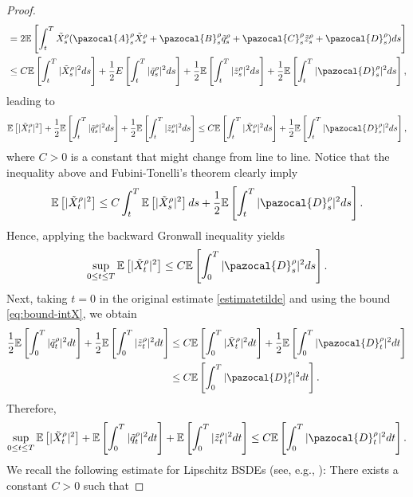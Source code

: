\documentclass[11pt,a4paper]{article}
\newcommand{\Ab}{\pazocal{A}}
\newcommand{\Bb}{\pazocal{B}}
\newcommand{\Cb}{\pazocal{C}}
\newcommand{\Db}{\pazocal{D}}
\begin{document}
\begin{proof}
\begin{align*}
    &=2\mathbb E \left[\int_t^T \tilde{X}_s^\rho (\Ab_s^\rho \tilde{X}_s^\rho+\Bb_s^\rho \tilde{q}_s^\rho+\Cb_s^\rho \tilde{z}_s^\rho+ \Db_s^\rho) ds \right]\\
    &\leq C \mathbb E \left[\int_t^T |\tilde{X}_s^\rho|^2ds \right] +\frac{1}{2}E\left[\int_t^T |\tilde{q}_s^\rho|^2ds\right]+\frac{1}{2}\mathbb E\left[\int_t^T |\tilde{z}_s^\rho|^2ds \right]+\frac{1}{2}\mathbb E \left[\int_t^T |\Db_s^\rho|^2ds\right],
\end{align*}
leading to
\begin{equation}
\label{estimatetilde}
    \mathbb E\left[|\tilde{X}_t^\rho|^2\right] + \frac{1}{2}\mathbb E \left[\int_t^T |\tilde{q}_s^\rho|^2ds \right]+\frac{1}{2} \mathbb E \left[\int_t^T |\tilde{z}_s^\rho|^2ds\right] \leq C \mathbb E \left[\int_t^T |\tilde{X}_s^\rho|^2ds\right] +\frac{1}{2} \mathbb E \left[\int_t^T |\Db_s^\rho|^2ds \right],
\end{equation} 
where $C>0$ is a constant that might change from line to line.
Notice that the inequality above and Fubini-Tonelli's theorem clearly imply
\[
\mathbb E\left[|\tilde X_t^\rho|^2 \right] \le C\int_t^T\mathbb E\left[|\tilde X_s^\rho|^2\right]ds + \frac12\mathbb E \left[\int_t^T|\Db_s^\rho|^2ds\right].
\]
Hence, applying the backward Gronwall inequality yields
\begin{equation}\label{eq:bound-intX}
\sup_{0\le t\le T}\mathbb E\left[|\tilde X_t^\rho|^2 \right] \le C\mathbb E\left[\int_0^T|\Db_s^\rho|^2ds \right].
\end{equation}
Next, taking \(t=0\) in the original estimate \eqref{estimatetilde} and using the bound \eqref{eq:bound-intX}, we obtain
\begin{align*}
\frac12\mathbb E\left[\int_0^T|\tilde q_t^\rho|^2dt \right]+ \frac12\mathbb E \left[\int_0^T|\tilde z_t^\rho|^2dt \right]& \le C\mathbb E \left[\int_0^T|\tilde X_t^\rho|^2 dt\right] + \frac12 \mathbb E \left[\int_0^T|\Db_t^\rho|^2dt \right]\\ &\leq C\mathbb E \left[\int_0^T|\Db_t^\rho|^2dt \right].
\end{align*}
Therefore,
\begin{equation}\label{eq:bound-supX}
\sup_{0\le t\le T}\mathbb E \left[|\tilde X_t^\rho|^2 \right] + \mathbb E \left[\int_0^T|\tilde q_t^\rho|^2dt \right]+\mathbb E \left[\int_0^T|\tilde z_t^\rho|^2dt \right]\le C\mathbb E \left[\int_0^T|\Db_t^\rho|^2dt \right].
\end{equation}
We recall the following estimate for Lipschitz BSDEs (see, e.g., \cite[Theorem 4.2.3, p.84]{Zhang}): There exists a constant $C>0$ such that

\end{proof}
\end{document}
